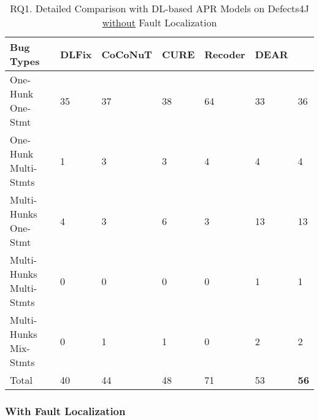 \begin{table}
	\caption{RQ1. Detailed Comparison with DL-based APR Models on Defects4J \underline{without} Fault Localization}
	\vspace{-7pt}
	\begin{center}
	  \small
          \tabcolsep 2.5pt
		\renewcommand{\arraystretch}{1} 
\begin{tabular}{p{2.9cm}<{\centering}|p{0.7cm}<{\centering}|p{1.1cm}<{\centering}|p{0.6cm}<{\centering}|p{0.8cm}<{\centering}|p{0.7cm}<{\centering}|p{0.7cm}}
			\hline
			Bug Types & DLFix& CoCoNuT & CURE & Recoder & DEAR & {\tool}\\\hline
			
			One-Hunk One-Stmt  & 35 & 37 & 38 & 64 & 33 & 36\\
			One-Hunk Multi-Stmts  & 1 &3 & 3 & 4 & 4 & 4\\ 
			Multi-Hunks One-Stmt  & 4 &3 & 6 & 3 & 13 & 13 \\
			Multi-Hunks Multi-Stmts  & 0 &0 & 0 & 0 & 1 & 1\\
			Multi-Hunks Mix-Stmts  & 0 & 1 & 1 & 0 & 2 & 2\\\hline
			Total & 40 & 44 & 48 & 71 & 53 & {\bf 56}\\
			\hline
		\end{tabular}
		\label{RQ1_1_1}
	\end{center}
	\vspace{-4pt} %
\end{table}



\subsubsection{{\bf With Fault Localization}}


